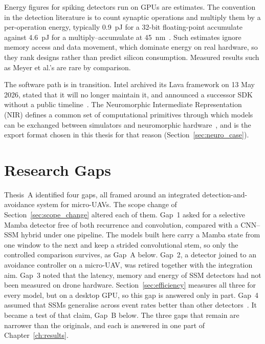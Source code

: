 \documentclass[11pt, a4paper]{report}
\begin{document}
Energy figures for spiking detectors run on GPUs are estimates. The convention in the
detection literature is to count synaptic operations and multiply them by a per-operation energy, typically
0.9~pJ for a 32-bit floating-point accumulate against 4.6~pJ for a multiply--accumulate at
45~nm~\cite{luo2024integer,su2023deep,horowitz2014computing}. Such estimates ignore memory access and data
movement, which dominate energy on real hardware, so they rank designs rather than predict silicon consumption. Measured results such as Meyer et al.'s are rare by comparison.

The software path is in transition. Intel archived its Lava framework on 13 May 2026, stated that it will
no longer maintain it, and announced a successor SDK without a public timeline~\cite{intel2026lava}. The
Neuromorphic Intermediate Representation (NIR) defines a common set of computational primitives through
which models can be exchanged between simulators and neuromorphic hardware~\cite{pedersen2024neuromorphic},
and is the export format chosen in this thesis for that reason (Section~\ref{sec:neuro_case}).

\section{Research Gaps}
\label{sec:gaps_revisited}
\label{sec:gaps_thesisA}%
Thesis~A identified four gaps, all framed around an integrated detection-and-avoidance system for micro-UAVs.
The scope change of Section~\ref{sec:scope_change} altered each of them. Gap~1 asked for a selective Mamba
detector free of both recurrence and convolution, compared with a CNN--SSM hybrid under one pipeline. The
models built here carry a Mamba state from one window to the next and keep a strided convolutional stem, so
only the controlled comparison survives, as Gap~A below. Gap~2, a detector joined to an avoidance controller
on a micro-UAV, was retired together with the integration aim. Gap~3 noted that the latency, memory and
energy of SSM detectors had not been measured on drone hardware. Section~\ref{sec:efficiency} measures all
three for every model, but on a desktop GPU, so this gap is answered only in part. Gap~4 assumed that SSMs
generalise across event rates better than other detectors~\cite{zubic2024state}. It became a test of that
claim, Gap~B below. The three gaps that remain are narrower than the originals, and each is answered in one
part of Chapter~\ref{ch:results}.
\end{document}
